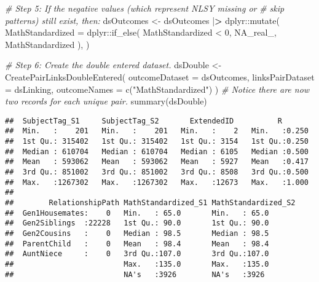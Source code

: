 \documentclass[smallextended]{svjour3}       %
\newenvironment{Shaded}{\begin{snugshade}}{\end{snugshade}}
\newcommand{\AttributeTok}[1]{\textcolor[rgb]{0.77,0.63,0.00}{#1}}
\newcommand{\CommentTok}[1]{\textcolor[rgb]{0.56,0.35,0.01}{\textit{#1}}}
\newcommand{\ConstantTok}[1]{\textcolor[rgb]{0.00,0.00,0.00}{#1}}
\newcommand{\DecValTok}[1]{\textcolor[rgb]{0.00,0.00,0.81}{#1}}
\newcommand{\ErrorTok}[1]{\textcolor[rgb]{0.64,0.00,0.00}{\textbf{#1}}}
\newcommand{\FunctionTok}[1]{\textcolor[rgb]{0.00,0.00,0.00}{#1}}
\newcommand{\NormalTok}[1]{#1}
\newcommand{\OtherTok}[1]{\textcolor[rgb]{0.56,0.35,0.01}{#1}}
\newcommand{\SpecialCharTok}[1]{\textcolor[rgb]{0.00,0.00,0.00}{#1}}
\newcommand{\StringTok}[1]{\textcolor[rgb]{0.31,0.60,0.02}{#1}}
\begin{document}
\begin{Shaded}
\begin{Highlighting}[]
\CommentTok{\# Step 5: If the negative values (which represent NLSY missing or}
\CommentTok{\#   skip patterns) still exist, then:}
\NormalTok{dsOutcomes }\OtherTok{\textless{}{-}}
\NormalTok{  dsOutcomes }\SpecialCharTok{|}\ErrorTok{\textgreater{}}
\NormalTok{  dplyr}\SpecialCharTok{::}\FunctionTok{mutate}\NormalTok{(}
    \AttributeTok{MathStandardized =}\NormalTok{ dplyr}\SpecialCharTok{::}\FunctionTok{if\_else}\NormalTok{(}
\NormalTok{      MathStandardized }\SpecialCharTok{\textless{}} \DecValTok{0}\NormalTok{,}
      \ConstantTok{NA\_real\_}\NormalTok{,}
\NormalTok{      MathStandardized}
\NormalTok{    ),}
\NormalTok{  )}

\CommentTok{\# Step 6: Create the double entered dataset.}
\NormalTok{dsDouble }\OtherTok{\textless{}{-}}
  \FunctionTok{CreatePairLinksDoubleEntered}\NormalTok{(}
    \AttributeTok{outcomeDataset   =}\NormalTok{ dsOutcomes,}
    \AttributeTok{linksPairDataset =}\NormalTok{ dsLinking,}
    \AttributeTok{outcomeNames     =} \FunctionTok{c}\NormalTok{(}\StringTok{"MathStandardized"}\NormalTok{)}
\NormalTok{  )}
\CommentTok{\# Notice there are now two records for each unique pair.}
\FunctionTok{summary}\NormalTok{(dsDouble)}
\end{Highlighting}
\end{Shaded}

\begin{verbatim}
##  SubjectTag_S1     SubjectTag_S2       ExtendedID          R        
##  Min.   :    201   Min.   :    201   Min.   :    2   Min.   :0.250  
##  1st Qu.: 315402   1st Qu.: 315402   1st Qu.: 3154   1st Qu.:0.250  
##  Median : 610704   Median : 610704   Median : 6105   Median :0.500  
##  Mean   : 593062   Mean   : 593062   Mean   : 5927   Mean   :0.417  
##  3rd Qu.: 851002   3rd Qu.: 851002   3rd Qu.: 8508   3rd Qu.:0.500  
##  Max.   :1267302   Max.   :1267302   Max.   :12673   Max.   :1.000  
##                                                                     
##        RelationshipPath MathStandardized_S1 MathStandardized_S2
##  Gen1Housemates:    0   Min.   : 65.0       Min.   : 65.0      
##  Gen2Siblings  :22228   1st Qu.: 90.0       1st Qu.: 90.0      
##  Gen2Cousins   :    0   Median : 98.5       Median : 98.5      
##  ParentChild   :    0   Mean   : 98.4       Mean   : 98.4      
##  AuntNiece     :    0   3rd Qu.:107.0       3rd Qu.:107.0      
##                         Max.   :135.0       Max.   :135.0      
##                         NA's   :3926        NA's   :3926
\end{verbatim}
\end{document}
